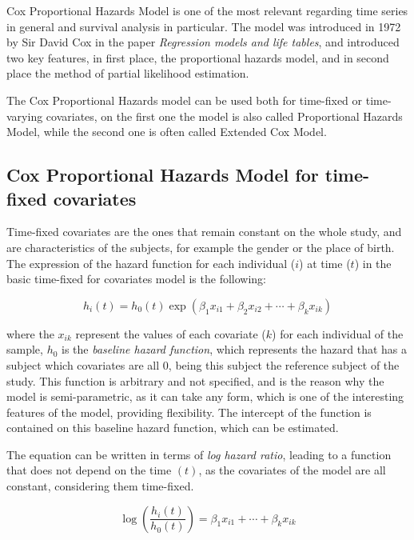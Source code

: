 \documentclass[11pt]{book} %
\begin{document}
    Cox Proportional Hazards Model is one of the most relevant regarding time series in general and survival analysis in particular. The model was introduced in 1972 by Sir David Cox in the paper \emph{Regression models and life tables}, and introduced two key features, in first place, the proportional hazards model, and in second place the method of partial likelihood estimation.

    The Cox Proportional Hazards model can be used both for time-fixed or time-varying covariates, on the first one the model is also called Proportional Hazards Model, while the second one is often called Extended Cox Model.

    \subsection{Cox Proportional Hazards Model for time-fixed covariates}

      Time-fixed covariates are the ones that remain constant on the whole study, and are characteristics of the subjects, for example the gender or the place of birth. The expression of the hazard function for each individual ($i$) at time ($t$) in the basic time-fixed for covariates model is the following:

      \begin{equation}
        h_i(t) = h_0(t)\exp(\beta_1x_{i1} + \beta_2x_{i2} + \cdots + \beta_kx_{ik})
        \label{eq:cox-fixed-time-hazards}
      \end{equation}

      where the $x_{ik}$ represent the values of each covariate ($k$) for each individual of the sample, $h_0$ is the \emph{baseline hazard function}, which represents the hazard that has a subject which covariates are all $0$, being this subject the reference subject of the study. This function is arbitrary and not specified, and is the reason why the model is semi-parametric, as it can take any form, which is one of the interesting features of the model, providing flexibility. The intercept of the function is contained on this baseline hazard function, which can be estimated.

      The equation can be written in terms of \emph{log hazard ratio}, leading to a function that does not depend on the time $(t)$, as the covariates of the model are all constant, considering them time-fixed.

      \begin{equation}
        \log\left(\frac{h_i(t)}{h_0(t)}\right) = \beta_1x_{i1} + \cdots + \beta_kx_{ik}
        \label{eq:cox-fixed-time-log-hazards-rate}
      \end{equation}
\end{document}
